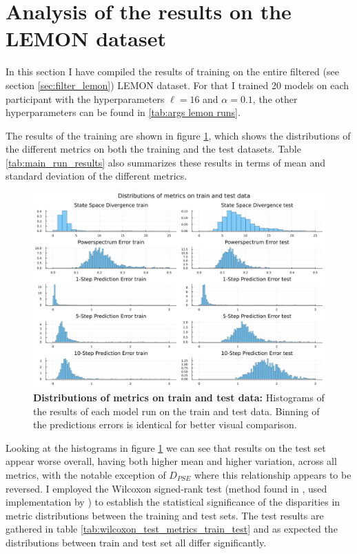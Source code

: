 \FloatBarrier
\section{Analysis of the results on the LEMON dataset} \label{sec:results_main_run}

In this section I have compiled the results of training on the entire filtered (see section \ref{sec:filter_lemon}) LEMON dataset.
For that I trained 20 models on each participant with the hyperparameters $\ell = 16$ and $\alpha=0.1$, the other hyperparameters can be found in \ref{tab:args lemon runs}.

The results of the training are shown in figure \ref{fig:histograms_metrics_main_run}, which shows the distributions of the different metrics on both the training 
and the test datasets. Table \ref{tab:main_run_results} also summarizes these results in terms of mean and standard deviation of the different metrics.


\begin{figure}
    \includegraphics[width=\textwidth]{Images/histograms_metrics_main_run.png}
    \caption[Distributions of metrics on train and test data]
    {\textbf{Distributions of metrics on train and test data: } Histograms of the results of each model run on the train and test data. Binning of the predictions errors 
    is identical for better visual comparison.}
    \label{fig:histograms_metrics_main_run}
\end{figure}

Looking at the histograms in figure \ref{fig:histograms_metrics_main_run} we can see that results on the test set appear worse overall, having both higher mean and 
higher variation, across all metrics, with the notable exception of $D_{PSE}$ where this relationship appears to be reversed.
I employed the Wilcoxon signed-rank test (method found in \cite{mcdonald2014handbook}, used implementation by \cite{2020SciPy-NMeth}) to establish the statistical
significance of the disparities in metric distributions between the training and test sets. The test results are gathered in table \ref{tab:wilcoxon_test_metrics_train_test}
and as expected the distributions between train and test set all differ significantly.

